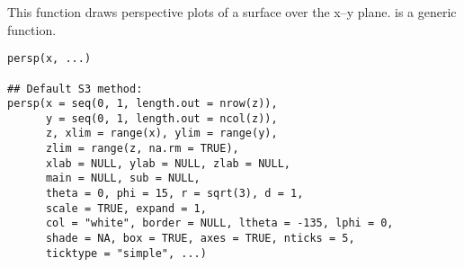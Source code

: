 %
\begin{Description}\relax
This function draws perspective plots of a surface over the
x--y plane.   is a generic function.
\end{Description}
%
\begin{Usage}
\begin{verbatim}
persp(x, ...)

## Default S3 method:
persp(x = seq(0, 1, length.out = nrow(z)),
      y = seq(0, 1, length.out = ncol(z)),
      z, xlim = range(x), ylim = range(y),
      zlim = range(z, na.rm = TRUE),
      xlab = NULL, ylab = NULL, zlab = NULL,
      main = NULL, sub = NULL,
      theta = 0, phi = 15, r = sqrt(3), d = 1,
      scale = TRUE, expand = 1,
      col = "white", border = NULL, ltheta = -135, lphi = 0,
      shade = NA, box = TRUE, axes = TRUE, nticks = 5,
      ticktype = "simple", ...)
\end{verbatim}
\end{Usage}
%
